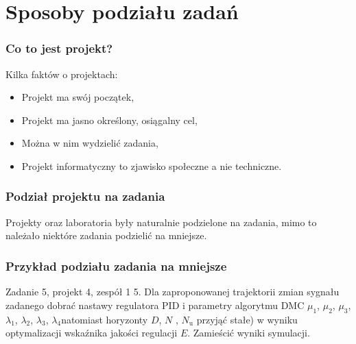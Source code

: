 \section{Sposoby podziału zadań}
\label{podzial_zadan}

\begin{frame}
    \frametitle{Co to jest projekt?}
    \begin{block}{}
        Kilka faktów o projektach:
    \end{block}
    \pause
    \begin{itemize}[<+->]
        \item Projekt ma swój początek,
        \item Projekt ma jasno określony, osiągalny cel,
        \item Można w nim wydzielić zadania,
        \item Projekt informatyczny to zjawisko społeczne a nie techniczne.
    \end{itemize} 
\end{frame}

\begin{frame}
    \frametitle{Podział projektu na zadania}
    \begin{block}{}
    Projekty oraz laboratoria były naturalnie podzielone na zadania, 
    mimo to należało niektóre zadania podzielić na mniejsze.
    \end{block}
\end{frame}

\begin{frame}
    \frametitle{Przykład podziału zadania na mniejsze}
    \begin{exampleblock}{Zadanie 5, projekt 4, zespół 1}
    5. Dla zaproponowanej trajektorii zmian sygnału zadanego dobrać nastawy regulatora
    PID i parametry algorytmu DMC $\mu_{\mathrm{1}}$, $\mu_{\mathrm{2}}$, $\mu_{\mathrm{3}}$, 
    $\lambda_{\mathrm{1}}$, $\lambda_{\mathrm{2}}$, $\lambda_{\mathrm{3}}$, $\lambda_{\mathrm{4}}$natomiast horyzonty $D$,
    $N$ , $N_{\mathrm{u}}$ przyjąć stałe) w wyniku optymalizacji wskaźnika jakości regulacji $E$. Zamieścić
    wyniki symulacji.   
    \end{exampleblock}
\end{frame}

